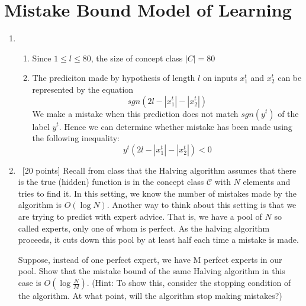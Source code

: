 \section{Mistake Bound Model of Learning}\label{sec:q2}

\begin{enumerate}
    \item~
    
    
	\begin{enumerate}
		\item
			Since $1 \leq l \leq 80$, the size of concept class $|C| = 80$	
		
		\item
			The prediciton made by hypothesis of length $l$ on inputs $x_1^t$ and $x_2^t$ can be represented by the equation $$ sgn(2l - |x_1^t| - |x_2^t|) $$ 
			We make a mistake when this prediction does not match $sgn(y^t)$ of the label $y^t$. Hence we can determine whether mistake has been made using the following inequality:					
			\begin{equation}
				\boxed{				
					y^t(2l - |x_1^t| - |x_2^t|) < 0	
				}	
			\end{equation}
	\end{enumerate}	    
    
    
    
    
    

    \item~[20 points] Recall from class that the Halving algorithm assumes that there is the true (hidden) function is in the concept class $\mathcal{C}$ with $N$ elements and tries to find it. In this setting, we know the number of mistakes made by the algorithm is $O(\log N)$.
        Another way to think about this setting is that we are trying to predict with expert advice. That is, we have a pool of $N$ so called experts, only one of whom is perfect. As the halving algorithm proceeds, it cuts down this pool by at least half each time a mistake is made.

        Suppose, instead of one perfect expert, we have M perfect experts in our pool. Show that the mistake bound of the same Halving algorithm in this case is $O(\log\frac{N}{M})$.
        (Hint: To show this, consider the stopping condition of the algorithm. At what point, will the algorithm stop making mistakes?)
\end{enumerate}

